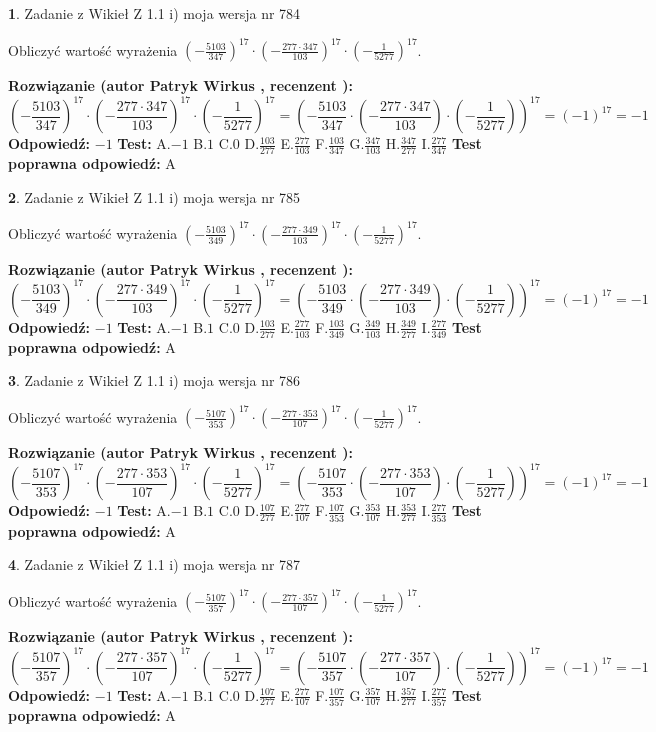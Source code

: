 \documentclass[12pt, a4paper]{article}
\theoremstyle{definition} %
\newtheorem{zad}{}
\newcommand{\zadStart}[1]{\begin{zad}#1\newline}
\newcommand{\zadStop}{\end{zad}}
\newcommand{\rozwStart}[2]{\noindent \textbf{Rozwiązanie (autor #1 , recenzent #2): }\newline}
\newcommand{\rozwStop}{\newline}
\newcommand{\odpStart}{\noindent \textbf{Odpowiedź:}\newline}
\newcommand{\odpStop}{\newline}
\newcommand{\testStart}{\noindent \textbf{Test:}\newline}
\newcommand{\testStop}{\newline}
\newcommand{\kluczStart}{\noindent \textbf{Test poprawna odpowiedź:}\newline}
\newcommand{\kluczStop}{\newline}
\begin{document}
\zadStart{Zadanie z Wikieł Z 1.1 i) moja wersja nr 784}

Obliczyć wartość wyrażenia $(-\frac{5103}{347})^{17} \cdot (-\frac{277 \cdot 347}{103})^{17} \cdot (-\frac{1}{5277})^{17}$.
\zadStop
\rozwStart{Patryk Wirkus}{}
$$(-\frac{5103}{347})^{17} \cdot (-\frac{277 \cdot 347}{103})^{17} \cdot (-\frac{1}{5277})^{17} = (-\frac{5103}{347} \cdot (-\frac{277 \cdot 347}{103}) \cdot (-\frac{1}{5277}))^{17} = (-1)^{17} = -1$$
\rozwStop
\odpStart
$-1$
\odpStop
\testStart
A.$-1$ B.$1$ C.$0$ D.$\frac{103}{277}$ E.$\frac{277}{103}$
F.$\frac{103}{347}$ G.$\frac{347}{103}$
H.$\frac{347}{277}$
I.$\frac{277}{347}$
\testStop
\kluczStart
A
\kluczStop



\zadStart{Zadanie z Wikieł Z 1.1 i) moja wersja nr 785}

Obliczyć wartość wyrażenia $(-\frac{5103}{349})^{17} \cdot (-\frac{277 \cdot 349}{103})^{17} \cdot (-\frac{1}{5277})^{17}$.
\zadStop
\rozwStart{Patryk Wirkus}{}
$$(-\frac{5103}{349})^{17} \cdot (-\frac{277 \cdot 349}{103})^{17} \cdot (-\frac{1}{5277})^{17} = (-\frac{5103}{349} \cdot (-\frac{277 \cdot 349}{103}) \cdot (-\frac{1}{5277}))^{17} = (-1)^{17} = -1$$
\rozwStop
\odpStart
$-1$
\odpStop
\testStart
A.$-1$ B.$1$ C.$0$ D.$\frac{103}{277}$ E.$\frac{277}{103}$
F.$\frac{103}{349}$ G.$\frac{349}{103}$
H.$\frac{349}{277}$
I.$\frac{277}{349}$
\testStop
\kluczStart
A
\kluczStop



\zadStart{Zadanie z Wikieł Z 1.1 i) moja wersja nr 786}

Obliczyć wartość wyrażenia $(-\frac{5107}{353})^{17} \cdot (-\frac{277 \cdot 353}{107})^{17} \cdot (-\frac{1}{5277})^{17}$.
\zadStop
\rozwStart{Patryk Wirkus}{}
$$(-\frac{5107}{353})^{17} \cdot (-\frac{277 \cdot 353}{107})^{17} \cdot (-\frac{1}{5277})^{17} = (-\frac{5107}{353} \cdot (-\frac{277 \cdot 353}{107}) \cdot (-\frac{1}{5277}))^{17} = (-1)^{17} = -1$$
\rozwStop
\odpStart
$-1$
\odpStop
\testStart
A.$-1$ B.$1$ C.$0$ D.$\frac{107}{277}$ E.$\frac{277}{107}$
F.$\frac{107}{353}$ G.$\frac{353}{107}$
H.$\frac{353}{277}$
I.$\frac{277}{353}$
\testStop
\kluczStart
A
\kluczStop



\zadStart{Zadanie z Wikieł Z 1.1 i) moja wersja nr 787}

Obliczyć wartość wyrażenia $(-\frac{5107}{357})^{17} \cdot (-\frac{277 \cdot 357}{107})^{17} \cdot (-\frac{1}{5277})^{17}$.
\zadStop
\rozwStart{Patryk Wirkus}{}
$$(-\frac{5107}{357})^{17} \cdot (-\frac{277 \cdot 357}{107})^{17} \cdot (-\frac{1}{5277})^{17} = (-\frac{5107}{357} \cdot (-\frac{277 \cdot 357}{107}) \cdot (-\frac{1}{5277}))^{17} = (-1)^{17} = -1$$
\rozwStop
\odpStart
$-1$
\odpStop
\testStart
A.$-1$ B.$1$ C.$0$ D.$\frac{107}{277}$ E.$\frac{277}{107}$
F.$\frac{107}{357}$ G.$\frac{357}{107}$
H.$\frac{357}{277}$
I.$\frac{277}{357}$
\testStop
\kluczStart
A
\kluczStop
\end{document}
